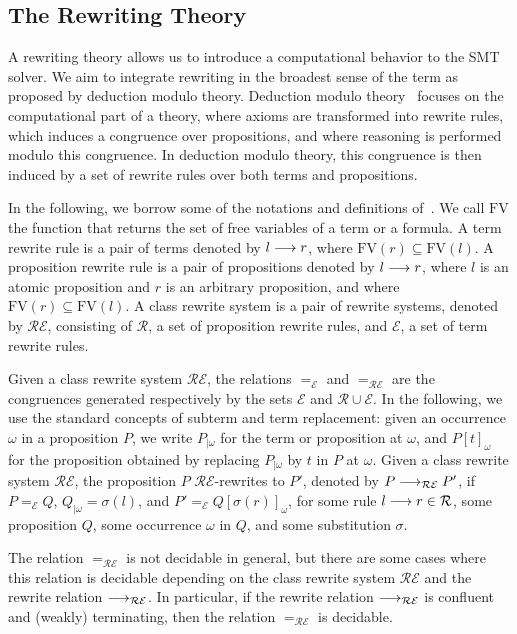 \subsection{The Rewriting Theory}
\label{sec:rew}

A rewriting theory allows us to introduce a computational behavior to the SMT
solver. We aim to integrate rewriting in the broadest sense of the term as
proposed by deduction modulo theory. Deduction modulo theory~\cite{DA03} focuses
on the computational part of a theory, where axioms are transformed into rewrite
rules, which induces a congruence over propositions, and where reasoning is
performed modulo this congruence. In deduction modulo theory, this congruence is
then induced by a set of rewrite rules over both terms and propositions.

In the following, we borrow some of the notations and definitions
of~\cite{DA03}. We call $\mathrm{FV}$ the function that returns the set of
free variables of a term or a formula. A term rewrite rule is a pair of terms
denoted by $l\longrightarrow{}r$, where $\mathrm{FV}(r)\subseteq\mathrm{FV}(l)$. A
proposition rewrite rule is a pair of propositions denoted by $l\longrightarrow{}r$, where
$l$ is an atomic proposition and $r$ is an arbitrary proposition, and where
$\mathrm{FV}(r)\subseteq\mathrm{FV}(l)$. A class rewrite system is a pair of
rewrite systems, denoted by $\mathcal{RE}$, consisting of $\mathcal{R}$, a set
of proposition rewrite rules, and $\mathcal{E}$, a set of term rewrite rules.

Given a class rewrite system $\mathcal{RE}$, the relations $=_\mathcal{E}$ and
$=_\mathcal{RE}$ are the congruences generated respectively by the sets
$\mathcal{E}$ and $\mathcal{R}\cup\mathcal{E}$. In the following, we use the
standard concepts of subterm and term replacement: given an occurrence $\omega$
in a proposition $P$, we write $P_{|\omega}$ for the term or proposition at
$\omega$, and $P[t]_\omega$ for the proposition obtained by replacing
$P_{|\omega}$ by $t$ in $P$ at $\omega$. Given a class rewrite system
$\mathcal{RE}$, the proposition $P$ $\mathcal{RE}$-rewrites to $P'$, denoted by
$P\longrightarrow_\mathcal{RE}P'$, if $P=_\mathcal{E}Q$, $Q_{|\omega}=\sigma(l)$, and
$P'=_\mathcal{E}Q[\sigma(r)]_\omega$, for some rule $l\longrightarrow{}r\in\mathcal{R}$,
some proposition $Q$, some occurrence $\omega$ in $Q$, and some substitution
$\sigma$.

The relation $=_\mathcal{RE}$ is not decidable in general, but there are some
cases where this relation is decidable depending on the class rewrite system
$\mathcal{RE}$ and the rewrite relation $\longrightarrow_\mathcal{RE}$. In particular, if
the rewrite relation $\longrightarrow_\mathcal{RE}$ is confluent and (weakly) terminating,
then the relation $=_\mathcal{RE}$ is decidable.

